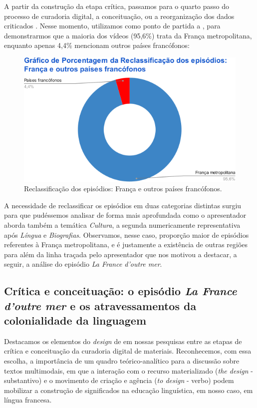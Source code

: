 \documentclass[portuguese]{textolivre}
\begin{document}
A partir da construção da etapa crítica, passamos para o quarto passo do processo de curadoria digital, a conceituação, ou a reorganização dos dados criticados \cite[p. 22]{deschaine_five_2015}. Nesse momento, utilizamos como ponto de partida a , para demonstrarmos que a maioria dos vídeos (95,6\%) trata da França metropolitana, enquanto apenas 4,4\% mencionam outros países francófonos:

\begin{figure}
    \centering
    \begin{minipage}{.75\textwidth}
    \includegraphics[width=\linewidth]{Fig2.png}
    \caption{Reclassificação dos episódios: França e outros países francófonos.}
    \label{fig2}
    \end{minipage}
\end{figure}

A necessidade de reclassificar os episódios em duas categorias distintas surgiu para que pudéssemos analisar de forma mais aprofundada como o apresentador aborda também a temática \textit{Cultura}, a segunda numericamente representativa após \textit{Língua} e \textit{Biografias}. Observamos, nesse caso, proporção maior de episódios referentes à França metropolitana, e é justamente a existência de outras regiões para além da linha traçada pelo apresentador que nos motivou a destacar, a seguir, a análise do episódio \textit{La France d’outre mer}.

\subsection{Crítica e conceituação: o episódio \textit{La France d’outre mer} e os atravessamentos da colonialidade da linguagem}\label{sec-fmt-manuscrito}
Destacamos os elementos do \textit{design} de \textcite{kalantzis_letramentos_2020} em nossas pesquisas entre as etapas de crítica e conceituação da curadoria digital de materiais. Reconhecemos, com essa escolha, a importância de um quadro teórico-analítico para a discussão sobre textos multimodais, em que a interação com o recurso materializado (\textit{the design} - substantivo) e o movimento de criação e agência (\textit{to design} - verbo) podem mobilizar a construção de significados na educação linguística, em nosso caso, em língua francesa.
\end{document}
